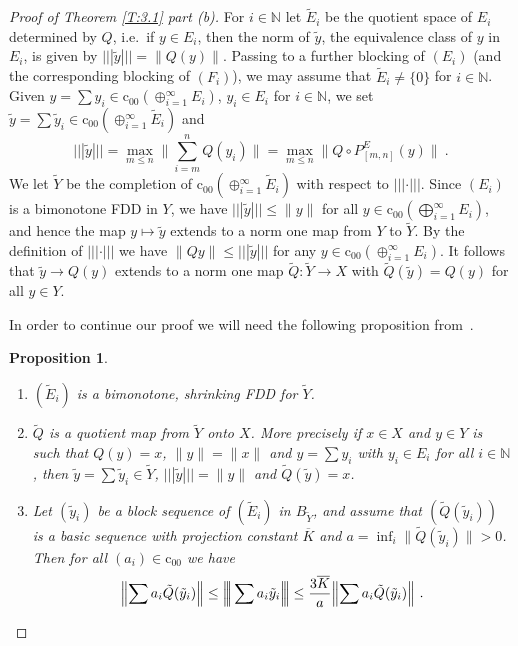 \documentclass[11pt,leqno]{amsart}
\newtheorem{prop}[thm]{Proposition}
\theoremstyle{definition}
\newcommand{\N}{\mathbb{N}}
\def\trivert#1{|\!|\!| #1|\!|\!|}
\def\Btrivert#1{\Big|\!\Big|\!\Big| #1\Big|\!\Big|\!\Big|}
\newcommand{\coo}{\mathrm{c}_{00}}
\newcommand{\norm}[1]{\lVert#1\rVert}
\newcommand{\Bignorm}[1]{\Bigl\lVert#1\Bigr\rVert}
\newcommand{\Et}{\tilde E}
\newcommand{\yt}{\tilde y}
\newcommand{\Qt}{\tilde Q}
\newcommand{\Yt}{\tilde Y}
\begin{document}
\begin{proof}[Proof of Theorem \ref{T:3.1} part (b)]
  For $i\in\N$ let $\Et_i$ be the quotient space of $E_i$ determined
  by $Q$, i.e.~if $y\in E_i$, then the norm of $\yt$, the equivalence
  class of $y$ in $E_i$, is given by $\trivert{\yt}=\|Q(y)\|$. Passing
  to a further blocking of $(E_i)$ (and the corresponding blocking of
  $(F_i)$), we may assume that $\Et_i\not=\{0\}$ for $i\in\N$. Given
  $y=\sum y_i \in \coo(\oplus_{i=1}^\infty E_i)$, $y_i\in E_i$ for
  $i\in\N$, we set $\yt=\sum \yt_i\in \coo(\oplus_{i=1}^\infty \Et_i)$
  and
  $$\trivert{\yt}=\max_{m\le n} \Big\|\sum_{i=m}^n
  Q(y_i)\Big\|=\max_{m\le n} \|Q\circ P^E_{[m,n]}(y)\|\ .$$
  We let $\Yt$ be the completion of $\coo(\oplus_{i=1}^\infty \Et_i)$
  with respect to $\trivert{\cdot}$. Since $(E_i)$ is a bimonotone FDD
  in $Y$, we have $\trivert{\yt}\leq\norm{y}$ for all $y\in
  \coo(\bigoplus_{i=1}^\infty E_i)$, and hence the map $y\mapsto \yt$
  extends to a norm one map from $Y$ to $\Yt$. By the definition of
  $\trivert{\cdot}$ we have $\norm{Qy}\leq \trivert{\yt}$ for any
  $y\in\coo(\oplus_{i=1}^\infty E_i)$. It follows that $\yt\to Q(y)$
  extends to a norm one map $\Qt\colon \Yt\to X$ with $\Qt(\yt)= Q(y)$
  for all $y\in Y$.
  
  In order to continue our proof we will need the following proposition
  from~\cite{OS2}.

  \begin{prop}
    \label{P:3.7}
    \cite[Proposition 2.6]{OS2}
    \begin{enumerate}
    \item[{a)}]
      $(\Et_i)$ is a bimonotone, shrinking FDD for $\Yt$.
    \item[{b)}]
      $\Qt$ is a quotient map from $\Yt $ onto $X$. More precisely if
      $x\in X$ and $y\in Y$ is such that $Q(y) = x$, $\|y\| =
      \|x\|$ and $y = \sum y_i$ with $y_i\in E_i$ for all $i\in\N$,
      then $\yt  = \sum \yt _i \in \Yt$, $\trivert{\yt } = \|y\|$ and
      $\Qt(\yt)  = x$.
    \item[{c)}] Let $(\yt _i)$ be a block sequence of $(\Et_i)$ in
      $B_{\Yt }$, and assume that $(\Qt(\yt _i))$ is a basic sequence
      with projection constant $\overline{K}$ and
      $a= \inf_i \|\Qt(\yt _i)\|>0$.
      Then for all  $(a_i)\in\coo$ we have
      \begin{equation*}
	\Bignorm{\sum a_i \Qt(\yt _i)}
	\le \Btrivert{\sum a_i\yt _i}
	\le \frac{3\overline{K}}{a} \Bignorm{\sum a_i \Qt(\yt _i)}\ .
      \end{equation*}
    \end{enumerate}
  \end{prop}


\end{proof}
\end{document}
